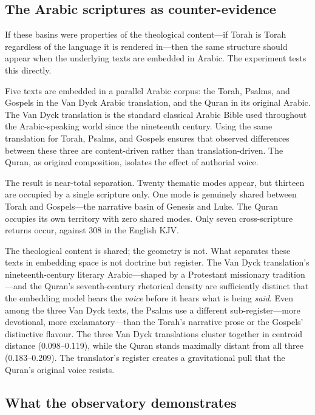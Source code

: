 \subsection{The Arabic scriptures as counter-evidence}

If these basins were properties of the theological content---if Torah is Torah regardless of the language it is rendered in---then the same structure should appear when the underlying texts are embedded in Arabic. The experiment tests this directly.

Five texts are embedded in a parallel Arabic corpus: the Torah, Psalms, and Gospels in the Van Dyck Arabic translation, and the Quran in its original Arabic. The Van Dyck translation is the standard classical Arabic Bible used throughout the Arabic-speaking world since the nineteenth century. Using the same translation for Torah, Psalms, and Gospels ensures that observed differences between these three are content-driven rather than translation-driven. The Quran, as original composition, isolates the effect of authorial voice.

The result is near-total separation. Twenty thematic modes appear, but thirteen are occupied by a single scripture only. One mode is genuinely shared between Torah and Gospels---the narrative basin of Genesis and Luke. The Quran occupies its own territory with zero shared modes. Only seven cross-scripture returns occur, against 308 in the English KJV.

The theological content is shared; the geometry is not. What separates these texts in embedding space is not doctrine but register. The Van Dyck translation's nineteenth-century literary Arabic---shaped by a Protestant missionary tradition---and the Quran's seventh-century rhetorical density are sufficiently distinct that the embedding model hears the \textit{voice} before it hears what is being \textit{said}. Even among the three Van Dyck texts, the Psalms use a different sub-register---more devotional, more exclamatory---than the Torah's narrative prose or the Gospels' distinctive flavour. The three Van Dyck translations cluster together in centroid distance (0.098--0.119), while the Quran stands maximally distant from all three (0.183--0.209). The translator's register creates a gravitational pull that the Quran's original voice resists.

\subsection{What the observatory demonstrates}

